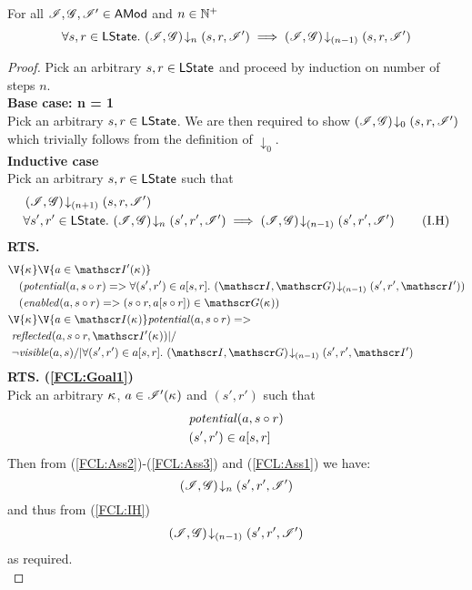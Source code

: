 \begin{lemma}[]\label{lem:future-closure}
For all $\mathscr{I}, \mathscr{G}, \mathscr{I}' \in \textsf{AMod}$ and $n \in \mathbb{N}^{+}$
%
\[
	\forall s, r \in \textsf{LState}.\, \left(\mathscr{I}, \mathscr{G}\right) \!\downarrow_{n} \left(s, r, \mathscr{I}'\right) \implies \left(\mathscr{I}, \mathscr{G}\right) \!\downarrow_{(n-1)} \left(s, r, \mathscr{I}'\right)
\]
%
\begin{proof} Pick an arbitrary $s, r \in \textsf{LState}$ and proceed by induction on number of steps $n$.\\

\noindent\textbf{Base case: n = 1}\\
Pick an arbitrary $s, r \in \textsf{LState}$. We are then required to show $\left(\mathscr{I}, \mathscr{G}\right) \!\downarrow_{0} \left(s, r, \mathscr{I}'\right)$ which trivially follows from the definition of $\downarrow_0$.\\

\noindent\textbf{Inductive case}\\
Pick an arbitrary $s, r \in \textsf{LState}$ such that
%
\begin{align}
	& \left(\mathscr{I}, \mathscr{G}\right) \!\downarrow_{(n+1)} \left(s, r, \mathscr{I}'\right) \label{FCL:Ass1}\\
	& \forall s', r' \in \textsf{LState}.\, \left(\mathscr{I}, \mathscr{G}\right) \!\downarrow_{n} \left(s', r', \mathscr{I}'\right) \implies \left(\mathscr{I}, \mathscr{G}\right) \!\downarrow_{(n-1)} \left(s', r', \mathscr{I}'\right) \tag{I.H} \label{FCL:IH}
\end{align}
%
\textbf{RTS. }
%
\begin{align}
	& 
	\V{\ca{}}  \V{a\in \lmod'(\ca{})} \nonumber \\
  &\quad (\m{potential}(a, s \composeL r) => \for{(s', r') \in a[s, r]} \extendsAMUpto{\lmod, \gmod}{(n-1)}{s'}{r'}{\lmod'})
  \label{FCL:Goal1}\\
%   
  &\quad (\m{enabled}(a,s \composeL r) => (s \composeL r, a[s \composeL r])\in \gmod(\ca{}))
  \label{FCL:Goal2}\\
%  
  &\V{\ca{}}\V{a\in \lmod(\ca{})}
  \m{potential}(a,s \composeL r) =>\null \nonumber \\
  &\ \m{reflected}(a, s \composeL r,\lmod'(\ca{})) |/\null \nonumber \\
%  
  &\ \neg\m{visible}(a, s) /| \for{(s', r') \in a[s, r]} \extendsAMUpto{\lmod, \gmod}{(n-1)}{s'}{r'}{\lmod'}  \label{FCL:Goal3}
\end{align}
%
\noindent\textbf{RTS. (\ref{FCL:Goal1})}\\
Pick an arbitrary $\kappa_{}$, $a \in \mathscr{I}'(\kappa_{})$ and $(s', r')$ such that 
\begin{align}
	& \mathit{potential}(a, s \circ r) \label{FCL:Ass2}\\
	& (s', r') \in a[s, r] \label{FCL:Ass3}
\end{align}
%
Then from (\ref{FCL:Ass2})-(\ref{FCL:Ass3}) and (\ref{FCL:Ass1}) we have:
%
\begin{equation}
	\left(\mathscr{I}, \mathscr{G}\right) \!\downarrow_{n} \left(s', r', \mathscr{I}'\right) \nonumber
\end{equation}
%
and thus from (\ref{FCL:IH})
%
\begin{align*}
	\left(\mathscr{I}, \mathscr{G}\right) \!\downarrow_{(n-1)} \left(s', r', \mathscr{I}'\right) 
\end{align*}
% 
as required.\\
%
%
%


\end{proof}
\end{lemma}
